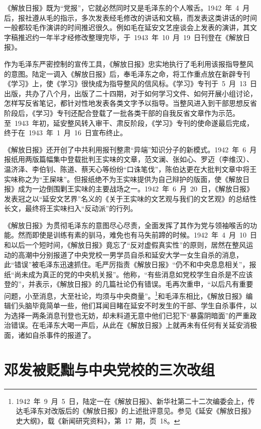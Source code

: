 《解放日报》既为“党报”，它就必然同时又是毛泽东的个人喉舌。1942~年~4~月后，报社遵从毛的指示，多次发表经毛修改的讲话和文稿，而发表这类讲话的时间一般都较毛作演讲的时间推迟很久。例如毛在延安文艺座谈会上发表的演讲，其文字稿推迟约一年半才经修改整理完毕，于~1943~年~10~月~19~日刊登在《解放日报》。

作为毛泽东严密控制的宣传工具，《解放日报》忠实地执行了毛利用该报指导整风的意图。陆定一调入《解放日报》后，奉毛泽东之命，将工作重点放在新辟专刊《学习》上，使《学习》很快成为指导整风的信风标。《学习》专刊于~5~月~13~日出版，共办了八个月，出版了二十四期，对于如何学习文件、如何开展小组讨论，怎样写反省笔记，都针对性地发表各类文字予以指导。当整风进入到干部思想反省阶段后，《学习》专刊还配合登载了一批各类干部的自我反省文章作为示范。至~1943~年初，延安整风转入审干、肃反阶段，《学习》专刊的使命遂最后完成，终于在~1943~年~1~月~16~日宣布终止。

《解放日报》还开创了中共利用报刊整肃“异端”知识分子的新模式。1942~年~6~月报纸用两版篇幅集中登载批判王实味的文章，范文澜、张如心、罗迈（李维汉）、温济泽、李伯钊、陈道、蔡天心等纷纷“口诛笔伐”，陈伯达更在大批判文章中将王实味称之为“王屎味”。但报纸绝不为王实味提供为自己辩护的版面，使《解放日报》成为一边倒围剿王实味的主要战场之一。1942~年~6~月~20~日，《解放日报》发表冠之以“延安文艺界”名义的《关于王实味的文艺观与我们的文艺观》的总结性长文，最终将王实味扫入“反动派”的行列。

《解放日报》为贯彻毛泽东的意图尽心尽责，全面发挥了其作为党与领袖喉舌的功能。然而即使是训练有素的驯马，难免也有马失前蹄的时候。1942~年~4~月~10~日和以后一个短时间，《解放日报》竟忘了“反对虚假真实性”的原则，居然在整风运动的高潮中分别报道了中央党校一男学员自杀和延安大学一女生自杀的消息，此“错误”被毛泽东迅速抓住。毛严厉指责《解放日报》“仍不和中央息息相关”，报纸“尚未成为真正的党的中央机关报”。他称，“有些消息如党校学生自杀是不应该登的”，并表示，《解放日报》的几篇社论仍有错误。毛再次重申，“以后凡有重要问题，小至消息，大至社论，均须与中央商量”。\footnote{1942~年~9~月~5~日，陆定一在《解放日报》、新华社第二十二次编委会上，传达毛泽东对改版后的《解放日报》的上述批评意见。参见《延安《解放日报》史大纲》，载《新闻研究资料》，第~17~期，页~18。}和毛泽东相比，《解放日报》编辑们头脑毕竟简单一些，他们耳闻目睹在延安不时发生的干部、学生自杀事件，以为选择一两条消息刊登也无妨，却未料道无意中他们已犯下“暴露阴暗面”的严重政治错误。在毛泽东大喝一声后，从此在《解放日报》上就再未有任何有关延安消极面，诸如自杀事件的报道了。

\section{邓发被贬黜与中央党校的三次改组}


